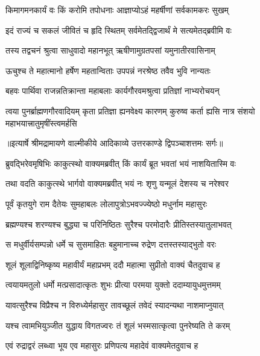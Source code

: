 \twolineshloka
{किमागमनकार्यं वः किं करोमि तपोधनाः}
{आज्ञाप्योऽहं महर्षीणां सर्वकामकरः सुखम्} %

\twolineshloka
{इदं राज्यं च सकलं जीवितं च हृदि स्थितम्}
{सर्वमेतद्द्विजार्थं मे सत्यमेतद्ब्रवीमि वः} %

\twolineshloka
{तस्य तद्वचनं श्रुत्वा साधुवादो महानभूत्}
{ऋषीणामुग्रतपसां यमुनातीरवासिनाम्} %

\twolineshloka
{ऊचुश्च ते महात्मानो हर्षेण महतान्विताः}
{उपपन्नं नरश्रेष्ठ तवैव भुवि नान्यतः} %

\twolineshloka
{बहवः पार्थिवा राजन्नतिक्रान्ता महाबलाः}
{कार्यगौरवमश्रुत्वा प्रतिज्ञां नाभ्यरोचयन्} %

\fourlineindentedshloka
{त्वया पुनर्ब्राह्मणगौरवादियम्}
{कृता प्रतिज्ञा ह्यनवेक्ष्य कारणम्}
{कुरुष्व कर्ता ह्यसि नात्र संशयो}
{महाभयात्त्रातुमृषींस्त्वमर्हसि} %


{॥इत्यार्षे श्रीमद्रामायणे वाल्मीकीये आदिकाव्ये उत्तरकाण्डे द्विपञ्चाशत्तमः सर्गः॥}


\twolineshloka
{ब्रुवद्भिरेवमृषिभिः काकुत्स्थो वाक्यमब्रवीत्}
{किं कार्यं ब्रूत भवतां भयं नाशयितास्मि वः} %

\twolineshloka
{तथा वदति काकुत्स्थे भार्गवो वाक्यमब्रवीत्}
{भयं नः शृणु यन्मूलं देशस्य च नरेश्वर} %

\twolineshloka
{पूर्वं कृतयुगे राम दैतेयः सुमहाबलः}
{लोलापुत्रोऽभवज्ज्येष्ठो मधुर्नाम महासुरः} %

\twolineshloka
{ब्रह्मण्यश्च शरण्यश्च बुद्ध्या च परिनिष्ठितः}
{सुरैश्च परमोदारैः प्रीतिस्तस्यातुलाभवत्} %

\twolineshloka
{स मधुर्वीर्यसम्पन्नो धर्मे च सुसमाहितः}
{बहुमानाच्च रुद्रेण दत्तस्तस्याद्भुतो वरः} %

\twolineshloka
{शूलं शूलाद्विनिष्कृष्य महावीर्यं महाप्रभम्}
{ददौ महात्मा सुप्रीतो वाक्यं चैतदुवाच ह} %

\twolineshloka
{त्वयायमतुलो धर्मो मत्प्रसादात्कृतः शुभः}
{प्रीत्या परमया युक्तो ददाम्यायुधमुत्तमम्} %

\twolineshloka
{यावत्सुरैश्च विप्रैश्च न विरुध्येर्महासुर}
{तावच्छूलं तवेदं स्यादन्यथा नाशमाप्नुयात्} %

\twolineshloka
{यश्च त्वामभियुञ्जीत युद्धाय विगतज्वरः}
{तं शूलं भस्मसात्कृत्वा पुनरेष्यति ते करम्} %

\twolineshloka
{एवं रुद्राद्वरं लब्ध्वा भूय एव महासुरः}
{प्रणिपत्य महादेवं वाक्यमेतदुवाच ह} %

